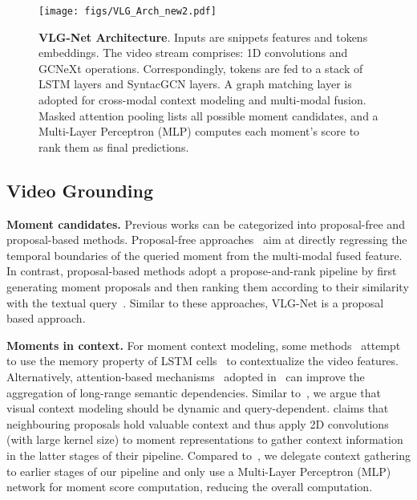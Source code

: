 \documentclass[10pt,twocolumn,letterpaper]{article}
\begin{document}
\begin{figure*}[t!]
    \centering
        \texttt{[image: figs/VLG\_Arch\_new2.pdf]} \caption{\textbf{VLG-Net Architecture}. 
    Inputs are snippets features and tokens embeddings. The video stream comprises: 1D convolutions and  GCNeXt operations. Correspondingly, tokens are fed to a stack of LSTM layers and  SyntacGCN layers. A graph matching layer is adopted for cross-modal context modeling and multi-modal fusion. Masked attention pooling lists all possible moment candidates, and a Multi-Layer Perceptron (MLP) computes each moment's score to rank them as final predictions.}
    \label{fig:arch}
    \vspace{-0.3cm}
\end{figure*}

\subsection{Video Grounding}
\noindent \textbf{Moment candidates.} Previous works can be categorized into  proposal-free and proposal-based methods. Proposal-free approaches~\cite{chenhierarchical, Liu_2018_ECCV, Mun_2020_CVPR, Rodriguez_2020_WACV, chen2020learning, ABLR, Zeng_2020_CVPR} aim at directly regressing the temporal boundaries of the queried moment from the multi-modal fused feature. In contrast, proposal-based methods adopt a propose-and-rank pipeline by first generating moment proposals and then ranking them according to their similarity with the  textual query~\cite{Hendricks_2017_ICCV, chen_etal_2018_temporally, QSPN,10.1145/3240508.3240549, wang2020temporally,  2DTAN_2020_AAAI}. Similar to these approaches, VLG-Net is a proposal based approach.

\noindent \textbf{Moments in context.} 
For moment context modeling, some methods~\cite{ chen_etal_2018_temporally, ghosh_etal_2019_excl} attempt to use the memory property of LSTM cells~\cite{HochSchm97} to contextualize the video features. 
Alternatively, attention-based mechanisms~\cite{NIPS2017_7181} adopted in~\cite{lin2020moment,ACRN_SIGIR_18, wang2020temporally} can improve the aggregation of long-range semantic dependencies. Similar to~\cite{wang2020temporally}, we argue that visual context modeling should be dynamic and query-dependent. \cite{ 2DTAN_2020_AAAI} claims that neighbouring proposals hold valuable context and thus apply 2D convolutions (with large kernel size) to moment representations to gather context information in the latter stages of their pipeline. 
Compared to~\cite{2DTAN_2020_AAAI}, we delegate context gathering to earlier stages of our pipeline and only use a Multi-Layer Perceptron (MLP) network for moment score computation, reducing the overall computation.
\end{document}
